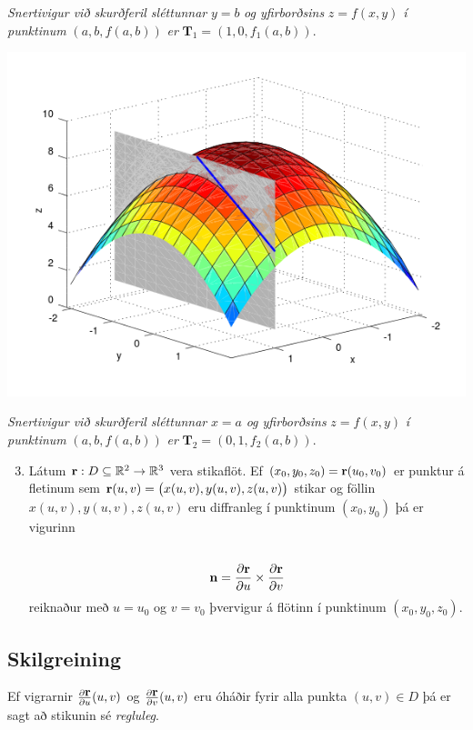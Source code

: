 \documentclass[a4paper,10pt,icelandic]{sphinxmanual}
\begin{document}
\emph{Snertivigur við skurðferil sléttunnar} \(y=b\) \emph{og yfirborðsins} \(z = f(x,y)\) \emph{í punktinum} \((a,b,f(a,b))\) \emph{er} \(\mathbf{T}_1 = (1,0,f_1(a,b))\).

{\hfill\includegraphics[width=0.700\linewidth]{ypart.png}\hfill}

\emph{Snertivigur við skurðferil sléttunnar} \(x=a\) \emph{og yfirborðsins} \(z = f(x,y)\) \emph{í punktinum} \((a,b,f(a,b))\) \emph{er} \(\mathbf{T}_2 = (0,1,f_2(a,b))\).
\begin{enumerate}
\setcounter{enumi}{2}
\item {} 
Látum
\(\mbox{${\bf r}$}: D\subseteq {\mathbb  R}^2\rightarrow {\mathbb  R}^3\)
vera stikaflöt. Ef \((x_0, y_0, z_0)=\mbox{${\bf r}$}(u_0, v_0)\)
er punktur á fletinum sem
\(\mbox{${\bf r}$}(u,v)=\big(x(u,v), y(u,v), z(u,v)\big)\) stikar
og föllin \(x(u,v), y(u,v), z(u,v)\) eru diffranleg í punktinum
\((x_0,
y_0)\) þá er vigurinn
\begin{gather}
\begin{split}\displaystyle\end{split}\notag\\\begin{split}\mbox{${\bf n}$}=\frac{\partial \mbox{${\bf r}$}}{\partial u}\times
\frac{\partial \mbox{${\bf r}$}}{\partial v}\end{split}\notag
\end{gather}
reiknaður með \(u=u_0\) og \(v=v_0\) þvervigur á flötinn í
punktinum \((x_0, y_0, z_0)\).

\end{enumerate}


\subsection{Skilgreining}
\label{Kafli5:id18}\label{Kafli5:index-6}
Ef vigrarnir \(\frac{\partial \mbox{${\bf r}$}}{\partial u}(u,v)\)
og \(\frac{\partial \mbox{${\bf r}$}}{\partial v}(u,v)\) eru óháðir
fyrir alla punkta \((u,v)\in D\) þá er sagt að stikunin sé
\emph{regluleg}.
\end{document}
